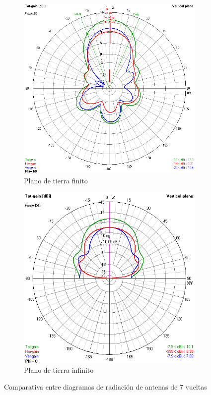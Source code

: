 \documentclass[12pt]{article}
\begin{document}
\begin{figure}[H]
	\centering
	\begin{subfigure}{.45\textwidth}
		\centering
		\includegraphics[width=0.9\linewidth]{gp_rad_435.png}
		\caption{Plano de tierra finito}
	\end{subfigure}%
	\begin{subfigure}{.45\textwidth}
		\centering
		\includegraphics[width=0.9\linewidth]{helix_1_435.png}
		\caption{Plano de tierra infinito}
	\end{subfigure}
	\caption{Comparativa entre diagramas de radiación de antenas de 7 vueltas}
\end{figure}
\end{document}
